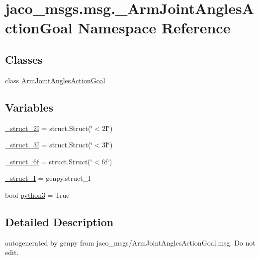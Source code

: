 \hypertarget{namespacejaco__msgs_1_1msg_1_1__ArmJointAnglesActionGoal}{}\section{jaco\+\_\+msgs.\+msg.\+\_\+\+Arm\+Joint\+Angles\+Action\+Goal Namespace Reference}
\label{namespacejaco__msgs_1_1msg_1_1__ArmJointAnglesActionGoal}
\subsection*{Classes}
\begin{DoxyCompactItemize}
\item 
class \hyperlink{classjaco__msgs_1_1msg_1_1__ArmJointAnglesActionGoal_1_1ArmJointAnglesActionGoal}{Arm\+Joint\+Angles\+Action\+Goal}
\end{DoxyCompactItemize}
\subsection*{Variables}
\begin{DoxyCompactItemize}
\item 
\hyperlink{namespacejaco__msgs_1_1msg_1_1__ArmJointAnglesActionGoal_a5dbd337584083dd8e716258bc1f80126}{\+\_\+struct\+\_\+2I} = struct.\+Struct(\char`\"{}$<$2\+I\char`\"{})
\item 
\hyperlink{namespacejaco__msgs_1_1msg_1_1__ArmJointAnglesActionGoal_aef5c2b83e19b99984c3c7054a8c6f9dd}{\+\_\+struct\+\_\+3I} = struct.\+Struct(\char`\"{}$<$3\+I\char`\"{})
\item 
\hyperlink{namespacejaco__msgs_1_1msg_1_1__ArmJointAnglesActionGoal_a4a82e6131f90bdfba18b2c53dba0bb6e}{\+\_\+struct\+\_\+6f} = struct.\+Struct(\char`\"{}$<$6f\char`\"{})
\item 
\hyperlink{namespacejaco__msgs_1_1msg_1_1__ArmJointAnglesActionGoal_a46eef47e77492d59cbce2bc42fcccf94}{\+\_\+struct\+\_\+I} = genpy.\+struct\+\_\+I
\item 
bool \hyperlink{namespacejaco__msgs_1_1msg_1_1__ArmJointAnglesActionGoal_aa21345bd6c78db7b5211f476abc8f7bd}{python3} = True
\end{DoxyCompactItemize}


\subsection{Detailed Description}
\begin{DoxyVerb}autogenerated by genpy from jaco_msgs/ArmJointAnglesActionGoal.msg. Do not edit.\end{DoxyVerb}
 

